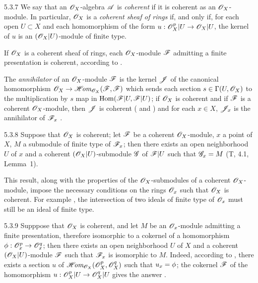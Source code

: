 \begin{env}{5.3.7}
\label{env-0.5.3.7}
We say that an $\mathscr{O}_X$-algebra $\mathscr{A}$ is \emph{coherent} if it is coherent as an
$\mathscr{O}_X$-module. In particular, $\mathscr{O}_X$ is a \emph{coherent sheaf of rings} if, and only if,
for each open $U\subset X$ and each homomorphism of the form $u:\mathscr{O}_X^p|U\to\mathscr{O}_X|U$, the
kernel of $u$ is an $(\mathscr{O}_X|U)$-module of finite type.

If $\mathscr{O}_X$ is a coherent sheaf of rings, each $\mathscr{O}_X$-module $\mathscr{F}$ admitting a finite
presentation  is coherent, according to .

The \emph{annihilator} of an $\mathscr{O}_X$-module $\mathscr{F}$ is the kernel $\mathscr{J}$ of the canonical
homomorphism $\mathscr{O}_X\to\mathscr{H}\!\textit{om}_{\mathscr{O}_X}(\mathscr{F},\mathscr{F})$ which sends each section
$s\in\Gamma(U,\mathscr{O}_X)$ to the multiplication by $s$ map in ${\mathop{\mathrm{Hom}}\nolimits}(\mathscr{F}|U,\mathscr{F}|U)$; if
$\mathscr{O}_X$ is coherent and if $\mathscr{F}$ is a coherent $\mathscr{O}_X$-module, then $\mathscr{J}$ is coherent
( and ) and for each $x\in X$, $\mathscr{J}_x$ is the
annihilator of $\mathscr{F}_x$ .
\end{env}

\begin{env}{5.3.8}
\label{env-0.5.3.8}
Suppose that $\mathscr{O}_X$ is coherent; let $\mathscr{F}$ be a coherent $\mathscr{O}_X$-module, $x$ a point of
$X$, $M$ a submodule of finite type of $\mathscr{F}_x$; then there exists an open neighborhood $U$
of $x$ and a coherent $(\mathscr{O}_X|U)$-submodule $\mathscr{G}$ of $\mathscr{F}|U$ such that $\mathscr{G}_x=M$
(T, 4.1, Lemma~1).

This result, along with the properties of the $\mathscr{O}_X$-submodules of a coherent
$\mathscr{O}_X$-module, impose the necessary conditions on the rings $\mathscr{O}_x$ such that
$\mathscr{O}_X$ is coherent. For example , the intersection of two
ideals of finite type of $\mathscr{O}_x$ must still be an ideal of finite type.
\end{env}

\begin{env}{5.3.9}
\label{env-0.5.3.9}
Supppose that $\mathscr{O}_X$ is coherent, and let $M$ be an $\mathscr{O}_x$-module admitting a
finite presentation, therefore isomorphic to a cokernel of a homomorphism
$\phi:\mathscr{O}_x^p\to\mathscr{O}_x^q$; then there exists an open neighborhood $U$ of $X$ and
a coherent $(\mathscr{O}_X|U)$-module $\mathscr{F}$ such that $\mathscr{F}_x$ is isomorphic to
$M$. Indeed, according to , there exists a section $u$ of
$\mathscr{H}\!\textit{om}_{\mathscr{O}_X}(\mathscr{O}_X^p,\mathscr{O}_X^q)$ such that $u_x=\phi$; the cokernel $\mathscr{F}$
of the homomorphism $u:\mathscr{O}_X^p|U\to\mathscr{O}_X^q|U$ gives the answer
.
\end{env}

